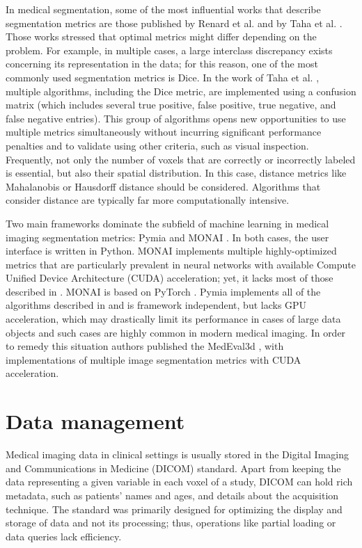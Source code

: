 \documentclass{juliacon}
\begin{document}
In medical segmentation, some of the most influential works that describe segmentation metrics are those published by Renard et al. \cite{Nature} and by Taha et al. \cite{TahaMainSegm}. Those works stressed that optimal metrics might differ depending on the problem. For example, in multiple cases, a large interclass discrepancy exists concerning its representation in the data; for this reason, one of the most commonly used segmentation metrics is Dice. In the work of Taha et al. \cite{TahaMainSegm}, multiple algorithms, including the Dice metric, are implemented using a confusion matrix (which includes several true positive, false positive, true negative, and false negative entries). This group of algorithms opens new opportunities to use multiple metrics simultaneously without incurring significant performance penalties and to validate using other criteria, such as visual inspection. Frequently, not only the number of voxels that are correctly or incorrectly labeled is essential, but also their spatial distribution. In this case, distance metrics like Mahalanobis or Hausdorff distance should be considered. Algorithms that consider distance are typically far more computationally intensive.

Two main frameworks dominate the subfield of machine learning in medical imaging segmentation metrics: Pymia \cite{Pymia} and MONAI \cite{MONAI}. In both cases, the user interface is written in Python. MONAI \cite{MONAI} implements multiple  highly-optimized metrics that are particularly prevalent in neural networks with available Compute Unified Device Architecture (CUDA) acceleration; yet, it lacks most of those described in \cite{TahaMainSegm}. MONAI is  based on PyTorch \cite{pytorch}. Pymia \cite{Pymia} implements all of the algorithms described in \cite{TahaMainSegm} and is framework independent, but lacks GPU acceleration, which may drastically limit its performance in cases of large data objects and such cases are highly common in modern medical imaging. In order to remedy this situation authors published the MedEval3d \cite{medEval}, with implementations of multiple image segmentation metrics with CUDA acceleration.


\section{Data management}
Medical imaging data in clinical settings is usually stored in the Digital Imaging and Communications in Medicine (DICOM) \cite{dicom} standard. Apart from keeping the data representing a given variable in each voxel of a study, DICOM can hold rich metadata, such as patients' names and ages, and details about the acquisition technique.  The standard was primarily designed for optimizing the display and storage of data and not its processing; thus, operations like partial loading or data queries lack efficiency.
\end{document}
